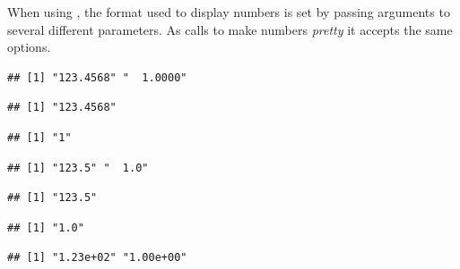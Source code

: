 \documentclass[krantz2]{krantz}\usepackage{knitr}
\begin{document}
When using , the format used to display numbers is set by passing arguments to several different parameters. As  calls  to make numbers \emph{pretty} it accepts the same options.

\begin{knitrout}\footnotesize
{}\color{fgcolor}\begin{kframe}
\begin{alltt}
 \hlkwb{=} \hlstd{(}\hlstd{,} \hlstd{)}
 
\end{alltt}
\begin{verbatim}
## [1] "123.4568" "  1.0000"
\end{verbatim}
\begin{alltt}
\hlstd{(x[}\hlstd{])} 
\end{alltt}
\begin{verbatim}
## [1] "123.4568"
\end{verbatim}
\begin{alltt}
\hlstd{(x[}\hlstd{])} 
\end{alltt}
\begin{verbatim}
## [1] "1"
\end{verbatim}
\begin{alltt}
  \hlstd{=} \hlstd{,}  \hlstd{=} \hlstd{)}
\end{alltt}
\begin{verbatim}
## [1] "123.5" "  1.0"
\end{verbatim}
\begin{alltt}
\hlstd{(x[}\hlstd{],}  \hlstd{=} \hlstd{,}  \hlstd{=} \hlstd{)}
\end{alltt}
\begin{verbatim}
## [1] "123.5"
\end{verbatim}
\begin{alltt}
\hlstd{(x[}\hlstd{],}  \hlstd{=} \hlstd{,}  \hlstd{=} \hlstd{)}
\end{alltt}
\begin{verbatim}
## [1] "1.0"
\end{verbatim}
\begin{alltt}
  \hlstd{=} \hlstd{,}  \hlstd{=} \hlstd{)}
\end{alltt}
\begin{verbatim}
## [1] "1.23e+02" "1.00e+00"
\end{verbatim}
\end{kframe}
\end{knitrout}
\end{document}
